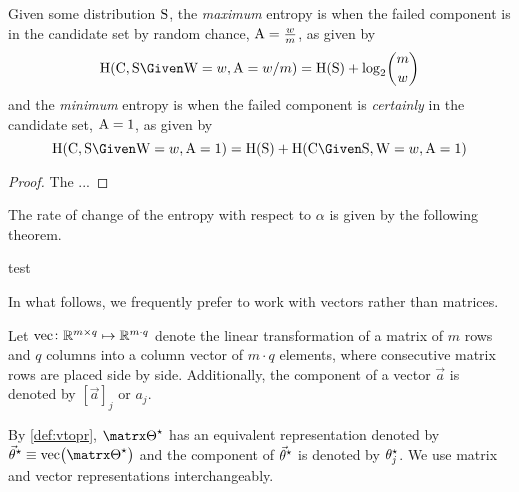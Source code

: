 \documentclass[../main.tex]{subfiles}
\begin{document}
Given some distribution $\mathrm{S}$, the \emph{maximum} entropy is when the failed component is in the candidate set by random chance, $\mathrm{A} = \frac{w}{m}$, as given by
\begin{equation}
\entropy(\rvcand, \sv \Given \RV{W}=w,\RV{A}=w/m) = \entropy(\sv) + \log_2 \! \binom{m}{w}
\end{equation}
and the \emph{minimum} entropy is when the failed component is \emph{certainly} in the candidate set, $\mathrm{A}=1$, as given by
\begin{equation}
	\entropy(\rvcand, \sv \Given \RV{W}=w,\RV{A}=1) = \entropy(\sv) + \entropy(\rvcand \Given \sv, \RV{W} = w, \RV{A} = 1)
\end{equation}
\begin{proof}
The ...
\end{proof}

The rate of change of the entropy with respect to $\alpha$ is given by the following theorem.
\begin{theorem}
	test
\end{theorem}



In what follows, we frequently prefer to work with vectors rather than matrices.
\begin{definition}
\label{def:vtopr}
Let $\operatorname{vec} \colon \mathbb{R}^{m \times q} \mapsto \mathbb{R}^{m \cdot q}$ denote the linear transformation of a matrix of $m$ rows and $q$ columns into a column vector of $m \cdot q$ elements, where consecutive matrix rows are placed side by side.
Additionally, the \jth component of a vector $\vec{a}$ is denoted by $\left[\vec{a}\right]_j$ or $a_j$.
\end{definition}
\begin{notation}
By \cref{def:vtopr}, $\tparam\sysparam$ has an equivalent representation denoted by $\tparam\sysparamvec \equiv \vtopr\!\left(\tparam\sysparam\right)$ and the \jth component of ${\vec{\theta}}^{\star}$ is denoted by ${\theta}^{\star}_j$.
We use matrix and vector representations interchangeably.
\end{notation}
\end{document}
